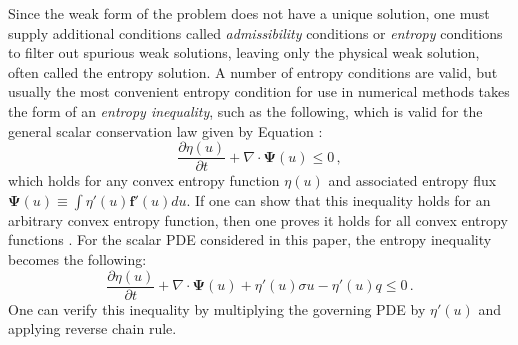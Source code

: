 \documentclass[xchauthor,chkrefs,fixeqskip,GCNS,amsmath,amsthm]{yjcphg}
\theoremstyle{remark}
\begin{document}
Since the weak form of the problem does not have a unique solution, one
must supply additional conditions called \emph{admissibility} conditions
or \emph{entropy} conditions to filter out spurious weak solutions,
leaving only the physical weak solution, often called the entropy
solution. A number of entropy conditions are valid, but usually the most
convenient entropy condition for use in numerical methods takes the form
of an \emph{entropy inequality}, such as the following, which is valid
for the general scalar conservation law given by Equation :
%
\begin{equation}
\frac{\partial\eta(u)}{\partial t} + \nabla\cdot\bm{\Psi}(u)
\leq0 \,,
\end{equation}
%
which holds for any convex entropy function $\eta(u)$ and associated
entropy flux $\bm{\Psi}(u) \equiv\int\eta'(u)\mathbf{f}'(u)du$.
If one can show that this inequality holds for an arbitrary convex
entropy function, then one proves it holds for all convex entropy
functions \cite{leveque2002,guermond_ev}. For the scalar PDE
considered in this paper, the entropy inequality becomes the following:
%
\begin{equation}
\frac{\partial\eta(u)}{\partial t} + \nabla\cdot\bm{\Psi}(u)
+ \eta'(u)\sigma u - \eta'(u)q
\leq0 \,.
\end{equation}
%
One can verify this inequality by multiplying the governing PDE by
$\eta'(u)$ and applying reverse chain rule.
\end{document}
